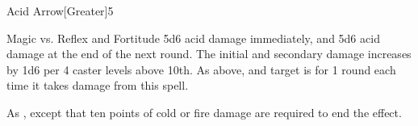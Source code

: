 \begin{spellsection}{Acid Arrow}[Greater]{5}
\begin{spellheader}
\end{spellheader}
\begin{spellcontent}
    \begin{spelltargetinginfo}
    \end{spelltargetinginfo}
    \begin{spelleffects}
        \begin{spellattack}{Magic vs. Reflex and Fortitude}
            \spellsuccess[Reflex] 5d6 acid damage immediately, and 5d6 acid damage at the end of the next round. The initial and secondary damage increases by 1d6 per 4 caster levels above 10th.
             As above, and target is \staggered for 1 round each time it takes damage from this spell.
        \end{spellattack}
    \end{spelleffects}
\end{spellcontent}
\begin{spellfooter}
    \spellnotes As , except that ten points of cold or fire damage are required to end the effect.
\end{spellfooter}
\end{spellsection}

